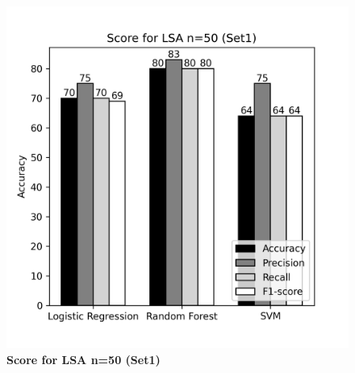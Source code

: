 \documentclass[12pt]{report}
\begin{document}
\begin{figure}[!htb]
\begin{minipage}{0.48\textwidth}
                  \includegraphics[scale=0.55]{plots/Score for LSA n=50 (Set1).png}
                  \caption{\textbf{Score for LSA n=50 (Set1)}}\label{Fig:typo2}
                \end{minipage}
             \end{figure}
\end{document}
